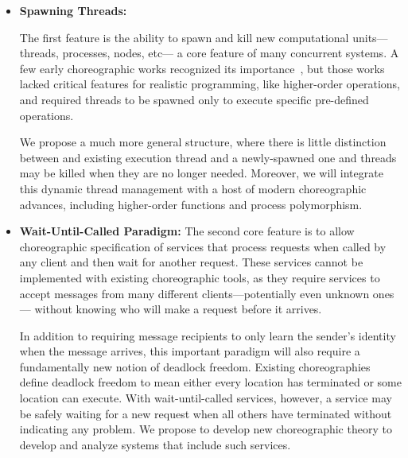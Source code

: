 \begin{itemize}[leftmargin=*]
\item \textbf{Spawning Threads:}

    The first feature is the ability to spawn and kill new computational units---threads, processes, nodes, etc---%
    a core feature of many concurrent systems.
    A few early choreographic works recognized its importance~\citep{CarboneM13,CruzFilipeM16a},
    but those works lacked critical features for realistic programming, like higher-order operations,
    and required threads to be spawned only to execute specific pre-defined operations.

    We propose a much more general structure, where there is little distinction between
    and existing execution thread and a newly-spawned one and threads may be killed when they are no longer needed.
    Moreover, we will integrate this dynamic thread management with a host of modern choreographic advances,
    including higher-order functions and process polymorphism.

  \item \textbf{Wait-Until-Called Paradigm:}
    The second core feature is to allow choreographic specification of services
    that process requests when called by any client and then wait for another request.
    These services cannot be implemented with existing choreographic tools,
    as they require services to accept messages from many different clients---potentially even unknown ones---%
    without knowing who will make a request before it arrives.

    In addition to requiring message recipients to only learn the sender's identity when the message arrives,
    this important paradigm will also require a fundamentally new notion of deadlock freedom.
    Existing choreographies define deadlock freedom to mean either every location has terminated or some location can execute.
    With wait-until-called services, however, a service may be safely waiting for a new request when all others have terminated without indicating any problem.
    We propose to develop new choreographic theory to develop and analyze systems that include such services.


\end{itemize}
